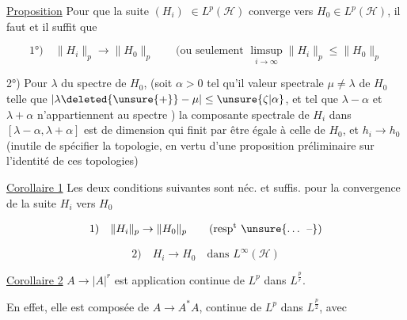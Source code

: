 
\uline{Proposition} Pour que la suite $(H_i)$  $\in L^p(\mathscr H)$ converge vers $H_0\in L^p(\mathscr H)$, il faut et il suffit que

\[
\text{1°)}\quad\|H_i\|_p\to\|H_0\|_p\qquad
\text{(ou seulement }\limsup_{i\to\infty}\|H_i\|_p\leq\|H_0\|_p
\]

2°) Pour  $\lambda$ du spectre de $H_0$, (soit $\alpha>0$ tel qu'il  valeur spectrale $\mu\neq\lambda$ de $H_0$ telle que $|\lambda\deleted{\unsure{+}}-\mu|\leq\unsure{\zeta|\alpha}$,   et tel que $\lambda-\alpha$ et $\lambda+\alpha$ n'appartiennent au spectre )  la composante spectrale de $H_i$  dans $[\lambda-\alpha,\lambda+\alpha]$ est de dimension  qui finit par être égale à celle de $H_0$, et $h_i\to h_0$ (inutile de spécifier la topologie, en vertu d'une proposition préliminaire sur l'identité de  ces topologies)


\uline{Corollaire 1} Les deux conditions suivantes sont néc. et suffis.  pour la convergence de la suite $H_i$ vers $H_0$

\[
\text{1)}\quad\|H_i\|_p\to\|H_0\|_p\qquad\text{(resp$^{\mathrm t}$ \unsure{\ldots{} --})}
\]

\[
\text{2)}\quad H_i\to H_0\quad\text{dans }L^\infty(\mathscr H)
\]

\uline{Corollaire 2} $A\to |A|^r$ est application continue de $L^p$ dans $L^{\frac pr}$.

En effet, elle est composée de $A\to A^*A$, continue de $L^p$ dans $L^{\frac p2}$, avec
